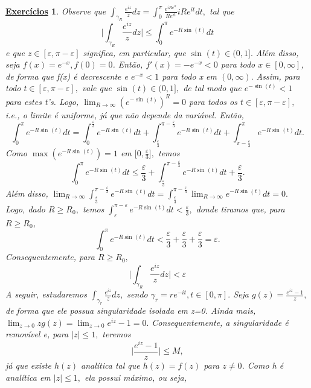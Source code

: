 \documentclass{article}
\newtheorem*{exer*}{\underline{Exerc\'icios}}
\begin{document}
\begin{exer*}
    Observe que \(\int_{\gamma_{R}}^{}\frac{e^{iz}}{z}dz = \int_{0}^{\pi }\frac{e^{iRe^{it}}}{R e^{it}}i R e^{it}dt,\) tal que 
    \[
      \biggl\vert \int_{\gamma_{R}}^{}\frac{e^{iz}}{z}dz \biggr\vert \leq \int_{0}^{\pi }e^{-R\sin^{}{(t)}}dt
    \]
    e que \(z\in[\varepsilon , \pi -\varepsilon ]\) significa, em particular, que \(\sin^{}{(t)}\in(0, 1].\) Além disso, seja
    \(f(x) = e^{-x}, f(0) = 0\). Então, \(f'(x) = -e^{-x}<0\) para todo \(x\in [0, \infty]\), de forma que f(x) é decrescente e \(e^{-x}<1\) para 
    todo x em \((0, \infty).\) Assim, para todo \(t\in[\varepsilon , \pi -\varepsilon ],\) vale que \(\sin^{}{(t)}\in(0, 1],\) de tal modo
    que \(e^{-\sin^{}{(t)}} < 1\) para estes t's. Logo, \(\lim_{R\to \infty}(e^{-\sin^{}{(t)}})^{R} = 0\) para todos os \(t\in[\varepsilon , \pi -\varepsilon ],\) i.e.,
    o limite é uniforme, já que não depende da variável. Então,
    \[
      \int_{0}^{\pi }e^{-R\sin^{}{(t)}}dt = \int_{0}^{\frac{\varepsilon }{3}}e^{-R\sin^{}{(t)}}dt + \int_{\frac{\varepsilon }{3}}^{\pi - \frac{\varepsilon }{3}}e^{-R\sin^{}{(t)}}dt + \int_{\pi - \frac{\varepsilon }{3}}^{\pi }e^{-R\sin^{}{(t)}}dt.
    \]
    Como \(\max{(e^{-R\sin^{}{(t)}})} = 1\) em \(\biggl[0, \frac{\varepsilon }{3}\biggr],\) temos 
    \[
      \int_{0}^{\pi }e^{-R\sin^{}{(t)}}dt \leq \frac{\varepsilon }{3} + \int_{\frac{\varepsilon }{3}}^{\pi - \frac{\varepsilon }{3}}e^{-R\sin^{}{(t)}}dt + \frac{\varepsilon }{3}. 
    \]
    Além disso, \(\lim_{R\to \infty}\int_{\frac{\varepsilon }{3}}^{\pi - \frac{\varepsilon }{3}}e^{-R\sin^{}{(t)}}dt = \int_{\frac{\varepsilon }{3}}^{\pi -\frac{\varepsilon }{3}}\lim_{R\to \infty}e^{-R\sin^{}{(t)}}dt = 0.\)
    Logo, dado \(R \geq R_{0},\) temos \(\int_{\varepsilon }^{\pi -\varepsilon }e^{-R\sin^{}{(t)}}dt < \frac{\varepsilon }{3},\) donde tiramos que, para \(R\geq R_{0}\),
    \[
      \int_{0}^{\pi }e^{-R\sin^{}{(t)}}dt < \frac{\varepsilon }{3}+\frac{\varepsilon }{3}+\frac{\varepsilon }{3} = \varepsilon .
    \]
    Consequentemente, para \(R\geq R_{0},\)
    \[
      \biggl\vert \int_{\gamma_{R}}^{}\frac{e^{iz}}{z}dz \biggr\vert < \varepsilon 
    \]
    A seguir, estudaremos \(\int_{\gamma_{r}}^{}\frac{e^{iz}}{z}dz,\) sendo \(\gamma_{r} = re^{-it}, t\in[0, \pi ].\)
    Seja \(g(z) = \frac{e^{iz}-1}{z},\) de forma que ele possua singularidade isolada em z=0. Ainda mais, \(\lim_{z\to 0}zg(z)=\lim_{z\to 0}e^{iz}-1 = 0.\)
    Consequentemente, a singularidade é removível e, para \(|z|\leq 1,\) teremos 
    \[
      \biggl\vert \frac{e^{iz}-1}{z} \biggr\vert \leq M,
    \]
    já que existe \(h(z)\) analítica tal que \(h(z)=f(z)\) para \(z\neq0\). Como h é analítica em \(|z|\leq 1,\) ela possui máximo, ou seja,

\end{exer*}
\end{document}
